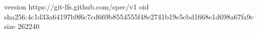 version https://git-lfs.github.com/spec/v1
oid sha256:4c1d33a64197b9f6c7cd669b8554555f48e2741b19e5cbd1668e1d698a67fa9c
size 262240
